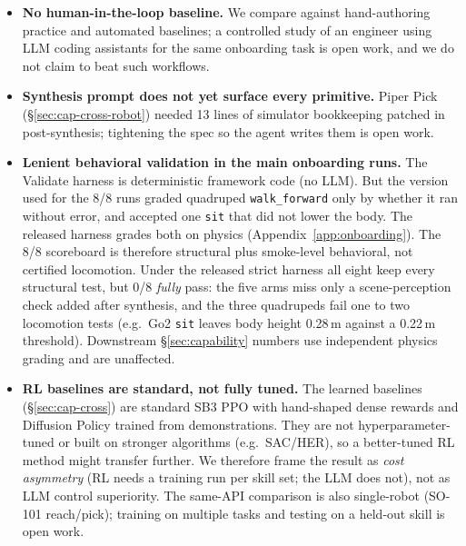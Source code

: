 \begin{itemize}
  simulator state (object poses, EE pose) via the synthesized
  driver rather than raw RGB. The cross-model study spans seven
  LLMs over five vendors (\S\ref{sec:cap-portability}), but an
  RGB-input tool-using agent baseline remains open work; a
  perception-grounded variant on physical hardware (wrist-mounted
  RGB-D) is our concrete next step.
\item \textbf{No human-in-the-loop baseline.} We compare against
  hand-authoring practice and automated baselines; a controlled
  study of an engineer using LLM coding assistants for the same
  onboarding task is open work, and we do not claim to beat such
  workflows.
\item \textbf{Synthesis prompt does not yet surface every
  primitive.} Piper Pick (\S\ref{sec:cap-cross-robot}) needed
  13 lines of simulator bookkeeping patched in post-synthesis;
  tightening the spec so the agent writes them is open work.
\item \textbf{Lenient behavioral validation in the main
  onboarding runs.} The Validate harness is deterministic
  framework code (no LLM). But the version used for the 8/8 runs
  graded quadruped \texttt{walk\_forward} only by whether it ran
  without error, and accepted one \texttt{sit} that did not lower
  the body. The released harness grades both on physics
  (Appendix~\ref{app:onboarding}). The 8/8 scoreboard is therefore
  structural plus smoke-level behavioral, not certified locomotion.
  Under the released strict harness all eight keep every structural
  test, but 0/8 \emph{fully} pass: the five arms miss only a
  scene-perception check added after synthesis, and the three
  quadrupeds fail one to two locomotion tests (e.g.\ Go2 \texttt{sit}
  leaves body height 0.28\,m against a 0.22\,m threshold). Downstream
  \S\ref{sec:capability} numbers use independent physics grading and
  are unaffected.
\item \textbf{RL baselines are standard, not fully tuned.} The
  learned baselines (\S\ref{sec:cap-cross}) are standard SB3 PPO with
  hand-shaped dense rewards and Diffusion Policy trained from
  demonstrations. They are not
  hyperparameter-tuned or built on stronger algorithms (e.g.\
  SAC/HER), so a better-tuned RL method might transfer further. We
  therefore frame the result as \emph{cost asymmetry} (RL needs a
  training run per skill set; the LLM does not), not as LLM control
  superiority. The same-API comparison is also single-robot (SO-101
  reach/pick); training on multiple tasks and testing on a held-out
  skill is open work.

\end{itemize}
